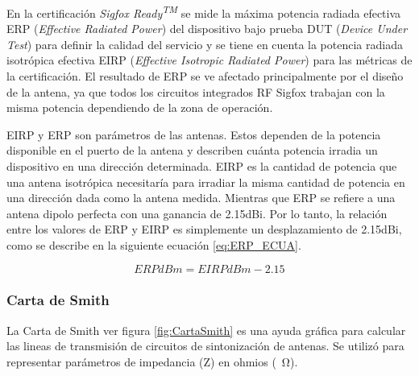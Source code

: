 En la certificación \textit{Sigfox Ready\textsuperscript{TM}} se mide la máxima potencia radiada efectiva ERP (\textit{Effective Radiated Power}) del dispositivo bajo prueba DUT (\textit{Device Under Test}) para definir la calidad del servicio y se tiene en cuenta la potencia radiada isotrópica efectiva EIRP (\textit{Effective Isotropic Radiated Power}) para las métricas de la certificación. El resultado de ERP se ve afectado principalmente por el diseño de la antena, ya que todos los circuitos integrados RF Sigfox trabajan con la misma potencia dependiendo de la zona de operación.

EIRP y ERP son parámetros de las antenas. Estos dependen de la potencia disponible en el puerto de la antena y describen cuánta potencia irradia un dispositivo en una dirección determinada. EIRP es la cantidad de potencia que una antena isotrópica necesitaría para irradiar la misma cantidad de potencia en una dirección dada como la antena medida\citep{Stutzman1981}. Mientras que ERP se refiere a una antena dipolo perfecta con una ganancia de 2.15dBi. Por lo tanto, la relación entre los valores de ERP y EIRP es simplemente un desplazamiento de 2.15dBi, como se describe en la siguiente ecuación \ref{eq:ERP_ECUA}.

\begin{equation}
	\label{eq:ERP_ECUA}
	ERPdBm = EIRPdBm - 2.15 
\end{equation}

\subsubsection{Carta de Smith}
La Carta de Smith ver figura \ref{fig:CartaSmith} es una ayuda gráfica para calcular las lineas de transmisión de circuitos de sintonización de antenas. Se utilizó para representar parámetros de impedancia (Z) en ohmios (\SI{}{\ohm}).

